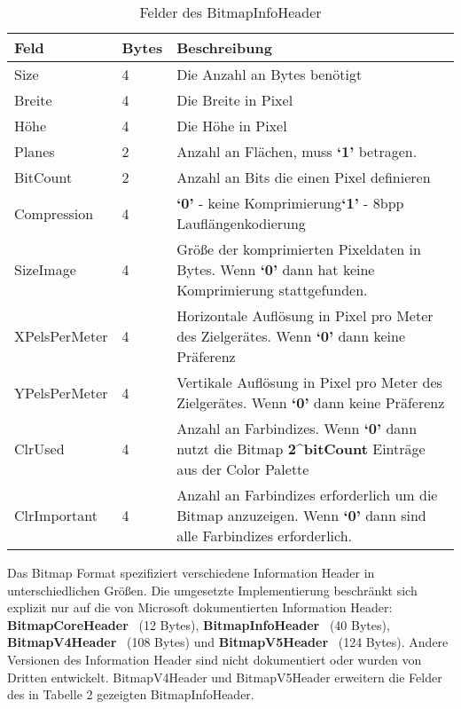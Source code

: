 \documentclass[course=erap]{aspdoc}
\begin{document}
\begin{table}[h!]
\begin{tabular}{ |p{6em}|p{3em}|p{25.75em}|  }
    \hline
    \textbf{Feld} & \textbf{Bytes} & \textbf{Beschreibung} \\
    \hline
    Size & 4 & Die Anzahl an Bytes benötigt \\
    \hline
    Breite & 4 & Die Breite in Pixel \\
    \hline
    Höhe & 4 & Die Höhe in Pixel \\
    \hline
    Planes & 2 & Anzahl an Flächen, muss \textbf{`1'} betragen. \\
    \hline
    BitCount & 2 & Anzahl an Bits die einen Pixel definieren \\
    \hline
    Compression & 4 & \textbf{`0'} - keine Komprimierung\newline \textbf{`1'} - 8bpp Lauflängenkodierung \\
    \hline
    SizeImage & 4 & Größe der komprimierten Pixeldaten in Bytes. \newline Wenn \textbf{`0'} dann hat keine Komprimierung stattgefunden. \\
    \hline
    XPelsPerMeter & 4 & Horizontale Auflösung in Pixel pro Meter des Zielgerätes. \newline Wenn \textbf{`0'} dann keine Präferenz \\
    \hline
    YPelsPerMeter & 4 & Vertikale Auflösung in Pixel pro Meter des Zielgerätes. \newline Wenn \textbf{`0'} dann keine Präferenz \\
    \hline
    ClrUsed & 4 & Anzahl an Farbindizes. Wenn \textbf{`0'} dann nutzt die Bitmap \textbf{2\textasciicircum bitCount} Einträge aus der Color Palette \\
    \hline
    ClrImportant & 4 & Anzahl an Farbindizes erforderlich um die Bitmap anzuzeigen. Wenn \textbf{`0'} dann sind alle Farbindizes erforderlich. \\
    \hline
\end{tabular}
\caption{Felder des BitmapInfoHeader}
\end{table}

Das Bitmap Format spezifiziert verschiedene Information Header in unterschiedlichen Größen. Die umgesetzte Implementierung beschränkt sich explizit nur auf die von Microsoft dokumentierten Information Header: \textbf{BitmapCoreHeader}~\cite{bitmapCoreHeader} (12 Bytes), \textbf{BitmapInfoHeader}~\cite{bitmapInfoHeader} (40 Bytes), \textbf{BitmapV4Header}~\cite{bitmapV4Header} (108 Bytes) und \textbf{BitmapV5Header}~\cite{bitmapV5Header} (124 Bytes). Andere Versionen des Information Header sind nicht dokumentiert oder wurden von Dritten entwickelt. BitmapV4Header und BitmapV5Header erweitern die Felder des in Tabelle 2 gezeigten BitmapInfoHeader.
\end{document}

